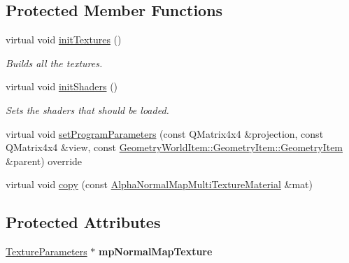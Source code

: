 \subsection*{Protected Member Functions}
\begin{DoxyCompactItemize}
\item 
\mbox{\label{class_geometry_engine_1_1_geometry_material_1_1_alpha_normal_map_multi_texture_material_a8a888830538be663a755488751eb4626}} 
virtual void \mbox{\hyperlink{class_geometry_engine_1_1_geometry_material_1_1_alpha_normal_map_multi_texture_material_a8a888830538be663a755488751eb4626}{init\+Textures}} ()
\begin{DoxyCompactList}\small\item\em Builds all the textures. \end{DoxyCompactList}\item 
\mbox{\label{class_geometry_engine_1_1_geometry_material_1_1_alpha_normal_map_multi_texture_material_aa3e075c1e1a28fc95e7e28e7354a84e4}} 
virtual void \mbox{\hyperlink{class_geometry_engine_1_1_geometry_material_1_1_alpha_normal_map_multi_texture_material_aa3e075c1e1a28fc95e7e28e7354a84e4}{init\+Shaders}} ()
\begin{DoxyCompactList}\small\item\em Sets the shaders that should be loaded. \end{DoxyCompactList}\item 
virtual void \mbox{\hyperlink{class_geometry_engine_1_1_geometry_material_1_1_alpha_normal_map_multi_texture_material_a38d93e639375db048fc688c4a9848029}{set\+Program\+Parameters}} (const Q\+Matrix4x4 \&projection, const Q\+Matrix4x4 \&view, const \mbox{\hyperlink{class_geometry_engine_1_1_geometry_world_item_1_1_geometry_item_1_1_geometry_item}{Geometry\+World\+Item\+::\+Geometry\+Item\+::\+Geometry\+Item}} \&parent) override
\item 
virtual void \mbox{\hyperlink{class_geometry_engine_1_1_geometry_material_1_1_alpha_normal_map_multi_texture_material_a5d221c020a7f96d7fbc8368d5113d06f}{copy}} (const \mbox{\hyperlink{class_geometry_engine_1_1_geometry_material_1_1_alpha_normal_map_multi_texture_material}{Alpha\+Normal\+Map\+Multi\+Texture\+Material}} \&mat)
\end{DoxyCompactItemize}
\subsection*{Protected Attributes}
\begin{DoxyCompactItemize}
\item 
\mbox{\label{class_geometry_engine_1_1_geometry_material_1_1_alpha_normal_map_multi_texture_material_a801daa6d41a655ef4b240b9b9e90a975}} 
\mbox{\hyperlink{class_geometry_engine_1_1_geometry_material_1_1_texture_parameters}{Texture\+Parameters}} $\ast$ {\bfseries mp\+Normal\+Map\+Texture}
\end{DoxyCompactItemize}
